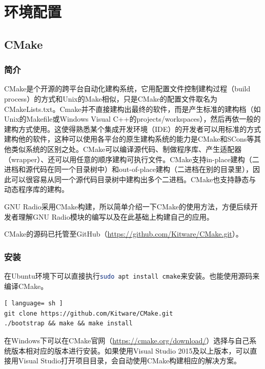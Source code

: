 \chapter{环境配置}
	\section{CMake}
		\subsection{简介}
			\par CMake是个开源的跨平台自动化建构系统，它用配置文件控制建构过程（build process）的方式和Unix的Make相似，只是CMake的配置文件取名为CMakeLists.txt。Cmake并不直接建构出最终的软件，而是产生标准的建构档（如Unix的Makefile或Windows Visual C++的projects/workspaces），然后再依一般的建构方式使用。这使得熟悉某个集成开发环境（IDE）的开发者可以用标准的方式建构他的软件，这种可以使用各平台的原生建构系统的能力是CMake和SCons等其他类似系统的区别之处。CMake可以编译源代码、制做程序库、产生适配器（wrapper）、还可以用任意的顺序建构可执行文件。CMake支持in-place建构（二进档和源代码在同一个目录树中）和out-of-place建构（二进档在别的目录里），因此可以很容易从同一个源代码目录树中建构出多个二进档。CMake也支持静态与动态程序库的建构。\cite{ wiki:CMake}
			\par GNU Radio采用CMake构建，所以简单介绍一下CMake的使用方法，方便后续开发者理解GNU Radio模块的编写以及在此基础上构建自己的应用。
			\par CMake的源码已托管至GitHub（\href{https://github.com/Kitware/CMake.git}{https://github.com/Kitware/CMake.git}）。
		\subsection{安装}
			\label{sec:CMake}
			\par 在Ubuntu环境下可以直接执行\lstinline[language=sh]{sudo apt install cmake}来安装。也能使用源码来编译CMake。
			\begin{lstlisting}[ language= sh ]
git clone https://github.com/Kitware/CMake.git
./bootstrap && make && make install
			\end{lstlisting}
			\par 在Windows下可以在CMake官网（\href{https://cmake.org/download/}{https://cmake.org/download/}）选择与自己系统版本相对应的版本进行安装。如果使用Visual Studio 2015及以上版本，可以直接用Visual Studio打开项目目录，会自动使用CMake构建相应的解决方案。
